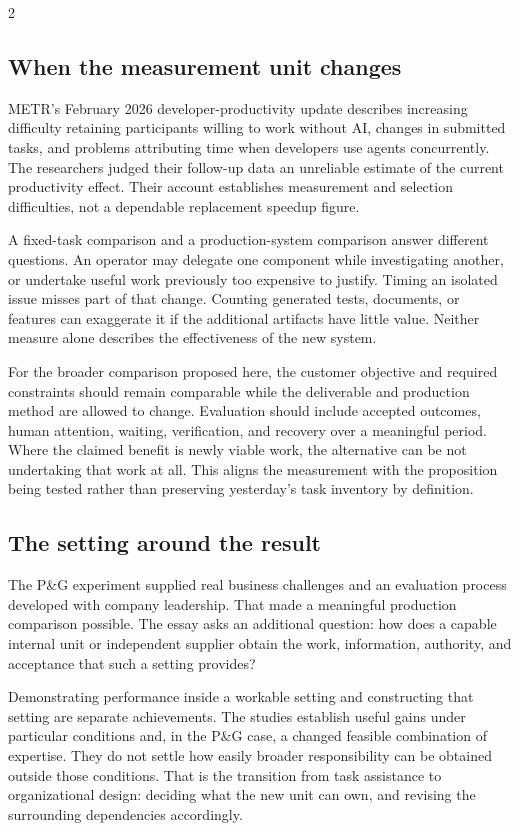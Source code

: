 \begin{multicols}{2}
\subsection{When the measurement unit
changes}\label{when-the-measurement-unit-changes}

METR's February 2026 developer-productivity update
\citep{becker2026experiment} describes increasing difficulty retaining
participants willing to work without AI, changes in submitted tasks, and
problems attributing time when developers use agents concurrently. The
researchers judged their follow-up data an unreliable estimate of the
current productivity effect. Their account establishes measurement and
selection difficulties, not a dependable replacement speedup figure.

A fixed-task comparison and a production-system comparison answer
different questions. An operator may delegate one component while
investigating another, or undertake useful work previously too expensive
to justify. Timing an isolated issue misses part of that change.
Counting generated tests, documents, or features can exaggerate it if
the additional artifacts have little value. Neither measure alone
describes the effectiveness of the new system.

For the broader comparison proposed here, the customer objective and
required constraints should remain comparable while the deliverable and
production method are allowed to change. Evaluation should include
accepted outcomes, human attention, waiting, verification, and recovery
over a meaningful period. Where the claimed benefit is newly viable
work, the alternative can be not undertaking that work at all. This
aligns the measurement with the proposition being tested rather than
preserving yesterday's task inventory by definition.

\subsection{The setting around the
result}\label{the-setting-around-the-result}

The P\&G experiment supplied real business challenges and an evaluation
process developed with company leadership. That made a meaningful
production comparison possible. The essay asks an additional question:
how does a capable internal unit or independent supplier obtain the
work, information, authority, and acceptance that such a setting
provides?

Demonstrating performance inside a workable setting and constructing
that setting are separate achievements. The studies establish useful
gains under particular conditions and, in the P\&G case, a changed
feasible combination of expertise. They do not settle how easily broader
responsibility can be obtained outside those conditions. That is the
transition from task assistance to organizational design: deciding what
the new unit can own, and revising the surrounding dependencies
accordingly.

\end{multicols}

